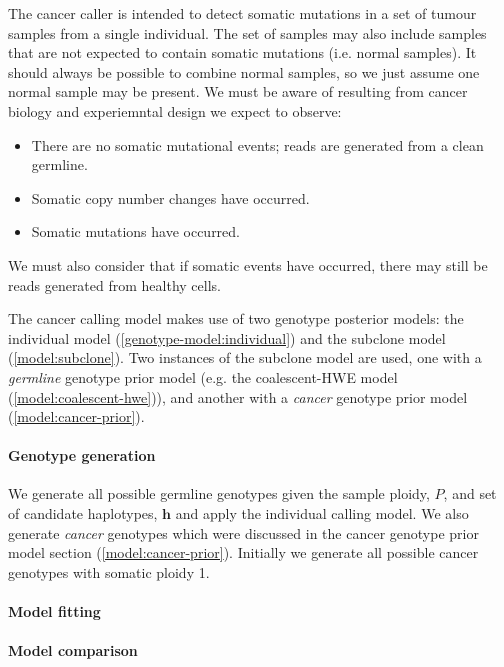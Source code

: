 \documentclass{article}
\begin{document}
The cancer caller is intended to detect somatic mutations in a set of tumour samples from a single individual. The set of samples may also include samples that are not expected to contain somatic mutations (i.e. normal samples). It should always be possible to combine normal samples, so we just assume one normal sample may be present. We must be aware of resulting from cancer biology and experiemntal design we expect to observe:

\begin{itemize}
	\item There are no somatic mutational events; reads are generated from a clean germline.
	\item Somatic copy number changes have occurred.
	\item Somatic mutations have occurred.
\end{itemize}

We must also consider that if somatic events have occurred, there may still be reads generated from healthy cells.

The cancer calling model makes use of two genotype posterior models: the individual model (\ref{genotype-model:individual}) and the subclone model (\ref{model:subclone}). Two instances of the subclone model are used, one with a \emph{germline} genotype prior model (e.g. the coalescent-HWE model (\ref{model:coalescent-hwe})), and another with a \emph{cancer} genotype prior model (\ref{model:cancer-prior}).

\paragraph{Genotype generation}

We generate all possible germline genotypes given the sample ploidy, $P$, and set of candidate haplotypes, $\boldsymbol{h}$ and apply the individual calling model. We also generate \emph{cancer} genotypes which were discussed in the cancer genotype prior model section (\ref{model:cancer-prior}). Initially we generate all possible cancer genotypes with somatic ploidy 1.

\paragraph{Model fitting}



\paragraph{Model comparison}
\end{document}
